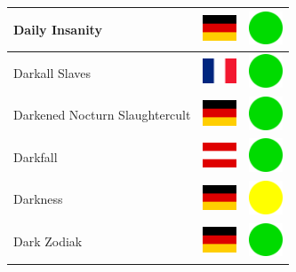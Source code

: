 \documentclass[12pt, a4paper, twoside]{report}
\begin{document}
\begin{center}
\begin{longtable}{|p{5cm}|p{2cm}|p{2cm}|}
Daily Insanity & \includegraphics[width=1cm]{4x3/de} & \includegraphics[width=1cm]{likes/y} \\ \hline
Darkall Slaves & \includegraphics[width=1cm]{4x3/fr} & \includegraphics[width=1cm]{likes/y} \\ \hline
Darkened Nocturn Slaughtercult & \includegraphics[width=1cm]{4x3/de} & \includegraphics[width=1cm]{likes/y} \\ \hline
Darkfall & \includegraphics[width=1cm]{4x3/at} & \includegraphics[width=1cm]{likes/y} \\ \hline
Darkness & \includegraphics[width=1cm]{4x3/de} & \includegraphics[width=1cm]{likes/m} \\ \hline
Dark Zodiak & \includegraphics[width=1cm]{4x3/de} & \includegraphics[width=1cm]{likes/y} \\ \hline

\end{longtable}
\end{center}
\end{document}

